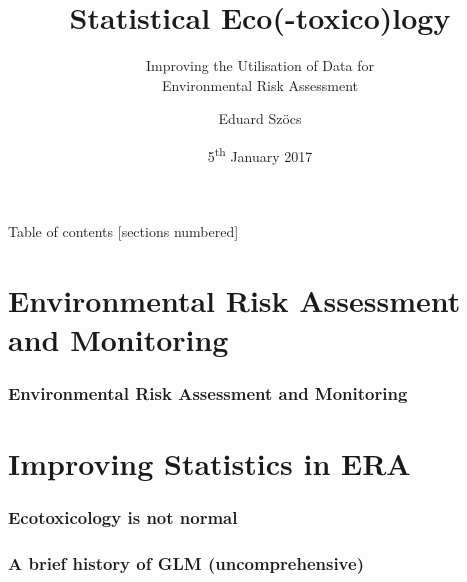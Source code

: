 \documentclass[10pt
	]{beamer}
\title{Statistical Eco(-toxico)logy}
\subtitle{Improving the Utilisation of Data for\\Environmental Risk Assessment}
\date{5\textsuperscript{th} January 2017}
\author{Eduard Sz\"{o}cs}
\begin{document}
\maketitle

\begin{frame}{Table of contents}
  [sections numbered]
  \tableofcontents[hideallsubsections]
\end{frame}

\section{Environmental Risk Assessment and Monitoring}

\begin{frame}
\frametitle{Environmental Risk Assessment and Monitoring}
 \resizebox{11.5cm}{!}{%
				
				}
\end{frame}


\section{Improving Statistics in ERA}


\begin{frame}
\frametitle{Ecotoxicology is not normal}

\end{frame}



\begin{frame}
\frametitle{A brief history of GLM (uncomprehensive)}

\end{frame}
\end{document}
